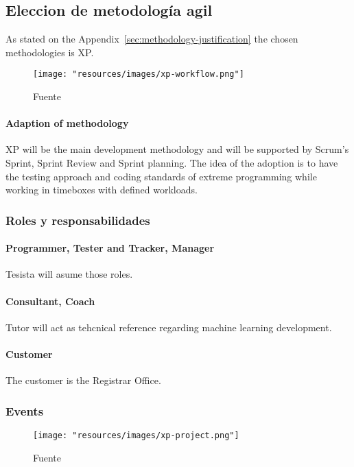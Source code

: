 \subsection{Eleccion de metodología agil}

As stated on the Appendix~\ref{sec:methodology-justification} the chosen methodologies is XP.

\begin{figure}
    \texttt{[image: "resources/images/xp-workflow.png"]}
    \caption{Fuente \textcite{abrahamsson2017agile}}\label{fig:xp-workflow}
\end{figure}

\paragraph{Adaption of methodology} XP will be the main development methodology and will be supported by Scrum's Sprint, Sprint Review and Sprint planning.
The idea of the adoption is to have the testing approach and coding standards of extreme programming while working in timeboxes with defined workloads.


\subsubsection{Roles y responsabilidades}

\paragraph{Programmer, Tester and Tracker, Manager} Tesista will asume those roles.

\paragraph{Consultant, Coach} Tutor will act as tehcnical reference regarding machine learning development.

\paragraph{Customer} The customer is the Registrar Office.

\subsubsection{Events}

\begin{figure}
    \texttt{[image: "resources/images/xp-project.png"]}
    \caption{Fuente \textcite{XpWeb}}\label{fig:xp-project}
\end{figure}

